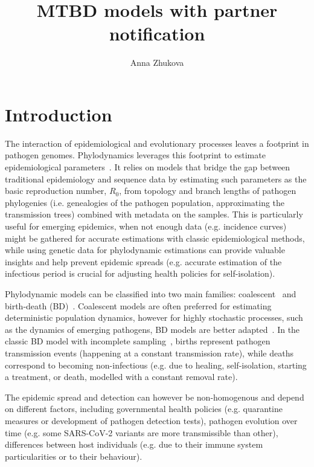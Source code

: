 \documentclass[a4paper,10pt]{article}
\title{MTBD models with partner notification}
\author{Anna Zhukova}
\begin{document}
\maketitle

%

\section{Introduction}
The interaction of epidemiological and evolutionary processes leaves a footprint in pathogen genomes. Phylodynamics leverages this footprint to estimate epidemiological parameters~\cite{Grenfell2004a,Volz2013}. It relies on models that bridge the gap between traditional epidemiology and sequence data by estimating such parameters as the basic reproduction number, $R_0$, from topology and branch lengths of pathogen phylogenies (i.e. genealogies of the pathogen population, approximating the transmission trees) combined with metadata on the samples. This is particularly useful for emerging epidemics, when not enough data (e.g. incidence curves) might be gathered for accurate estimations with classic epidemiological methods, while using genetic data for phylodynamic estimations can provide valuable insights and help prevent epidemic spreads (e.g. accurate estimation of the infectious period is crucial for adjusting health policies for self-isolation).


Phylodynamic models can be classified into two main families:  coalescent~\cite{Volz2009a,Drummond2005,Pybus2000a} and birth-death (BD)~\cite{Kendall1948,Maddison2007,Stadler2009,Stadler2010}. Coalescent models are often preferred for estimating deterministic population dynamics, however for highly stochastic processes, such as the dynamics of emerging pathogens, BD models are better adapted~\cite{Macpherson2021}. In the classic BD model with incomplete sampling~\cite{Stadler2009}, births represent pathogen transmission events (happening at a constant transmission rate), while deaths correspond to becoming non-infectious (e.g. due to healing, self-isolation, starting a treatment, or death, modelled with a constant removal rate). 

The epidemic spread and detection can however be non-homogenous and depend on different factors, including governmental health policies (e.g. quarantine measures or development of pathogen detection tests), pathogen evolution over time (e.g. some SARS-CoV-2 variants are more transmissible than other),  differences between host individuals (e.g. due to their immune system particularities or to their behaviour).
\end{document}
